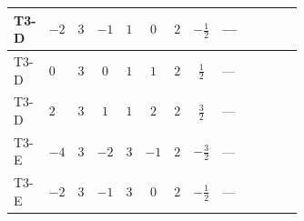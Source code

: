 \documentclass[8pt]{article}
\begin{document}
\begin{landscape}
\begin{longtable}{@{}llcccccc >{\raggedright\arraybackslash}p{0.21\linewidth} >{\raggedright\arraybackslash}p{0.21\linewidth} >{\raggedright\arraybackslash}p{0.21\linewidth}@{}}
\midrule
T3-D & $-2$ & $3$ & $-1$ & $1$ & $0$ & $2$ & $-\frac{1}{2}$ & --- & \scriptsize\adjustbox{max width=\linewidth}{$\begin{gathered} -2 \operatorname{Tr}\!\left({y_1}\,\left({y_1}\right)^{\dagger}\,{Y_e}\,\left({Y_e}\right)^{\dagger}\right)\end{gathered}$} & \scriptsize\adjustbox{max width=\linewidth}{$\begin{gathered} +4 {\lambda_5} \left({\lambda_5}\right)^{*}\end{gathered}$} \\
\midrule
T3-D & $0$ & $3$ & $0$ & $1$ & $1$ & $2$ & $\frac{1}{2}$ & --- & \scriptsize\adjustbox{max width=\linewidth}{$\begin{gathered} -2 \operatorname{Tr}\!\left({y_1}\,\left({y_1}\right)^{\dagger}\,{Y_e}\,\left({Y_e}\right)^{\dagger}\right)\end{gathered}$} & \scriptsize\adjustbox{max width=\linewidth}{$\begin{gathered} +4 {\lambda_5} \left({\lambda_5}\right)^{*}\end{gathered}$} \\
\midrule
T3-D & $2$ & $3$ & $1$ & $1$ & $2$ & $2$ & $\frac{3}{2}$ & --- & \scriptsize\adjustbox{max width=\linewidth}{$\begin{gathered} -2 \operatorname{Tr}\!\left({y_1}\,\left({y_1}\right)^{\dagger}\,{Y_e}\,\left({Y_e}\right)^{\dagger}\right)\end{gathered}$} & \scriptsize\adjustbox{max width=\linewidth}{$\begin{gathered} +4 {\lambda_5} \left({\lambda_5}\right)^{*}\end{gathered}$} \\
\midrule
T3-E & $-4$ & $3$ & $-2$ & $3$ & $-1$ & $2$ & $-\frac{3}{2}$ & --- & \scriptsize\adjustbox{max width=\linewidth}{$\begin{gathered} -2 \operatorname{Tr}\!\left({y_1}\,\left({y_1}\right)^{\dagger}\,{Y_e}\,\left({Y_e}\right)^{\dagger}\right)\end{gathered}$} & \scriptsize\adjustbox{max width=\linewidth}{$\begin{gathered} +4 {\lambda_5} \left({\lambda_5}\right)^{*}\end{gathered}$} \\
\midrule
T3-E & $-2$ & $3$ & $-1$ & $3$ & $0$ & $2$ & $-\frac{1}{2}$ & --- & \scriptsize\adjustbox{max width=\linewidth}{$\begin{gathered} -2 \operatorname{Tr}\!\left({y_1}\,\left({y_1}\right)^{\dagger}\,{Y_e}\,\left({Y_e}\right)^{\dagger}\right)\end{gathered}$} & \scriptsize\adjustbox{max width=\linewidth}{$\begin{gathered} +4 {\lambda_5} \left({\lambda_5}\right)^{*}\end{gathered}$} \\

\end{longtable}
\end{landscape}
\end{document}

